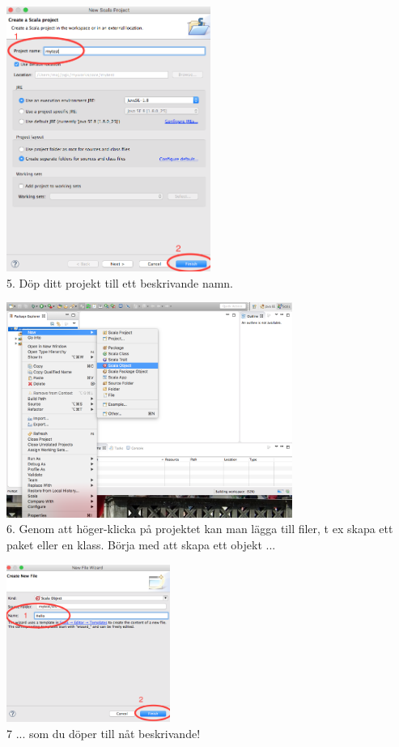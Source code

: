 \begin{center}
\vspace{5mm}

\includegraphics[width=0.5\textwidth]{../img/pirates/nameproject.png} \\
5.  Döp ditt projekt till ett beskrivande namn.

\vspace{5mm}
\includegraphics[width=0.7\textwidth]{../img/pirates/createobject.png} \\
6. Genom att höger-klicka på projektet kan man lägga till filer, t ex skapa ett paket eller en klass. Börja med att skapa ett objekt ...

\vspace{5mm}

\includegraphics[width=0.4\textwidth]{../img/pirates/nameobject.png} \\
7 ... som du döper till nåt beskrivande!


\end{center}
